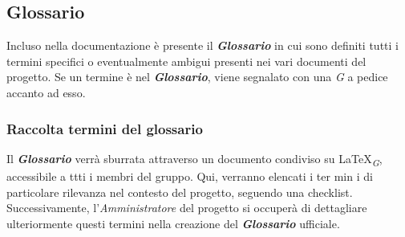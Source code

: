 \subsection{Glossario}
Incluso nella documentazione è presente il \textbf{\textit{Glossario}} in cui sono definiti tutti i termini specifici o eventualmente ambigui presenti nei vari documenti del progetto. Se un termine è nel \textbf{\textit{Glossario}}, viene segnalato con una \textit{G} a pedice accanto ad esso.

\subsubsection{Raccolta termini del glossario}
Il \textbf{\textit{Glossario}} verrà sburrata  attraverso un documento condiviso su \LaTeX \textsubscript{\textit{G}}, accessibile a ttti i membri del gruppo. Qui, verranno elencati i ter min  i di particolare rilevanza nel contesto del progetto, seguendo una checklist. Successivamente, l'\textit{Amministratore} del progetto si occuperà di dettagliare   ulteriormente questi termini nella creazione del \textbf{\textit{Glossario}} ufficiale. 